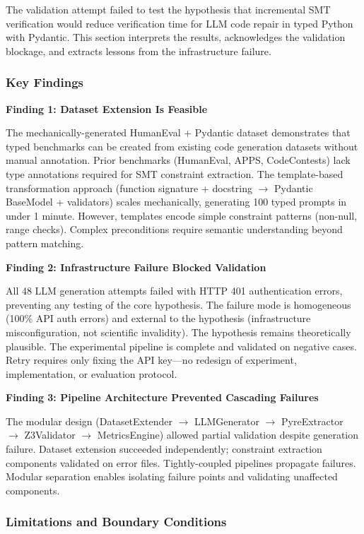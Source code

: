 
The validation attempt failed to test the hypothesis that incremental SMT verification would reduce verification time for LLM code repair in typed Python with Pydantic. This section interprets the results, acknowledges the validation blockage, and extracts lessons from the infrastructure failure.

\subsubsection{Key Findings}

\textbf{Finding 1: Dataset Extension Is Feasible}

The mechanically-generated HumanEval + Pydantic dataset demonstrates that typed benchmarks can be created from existing code generation datasets without manual annotation. Prior benchmarks (HumanEval, APPS, CodeContests) lack type annotations required for SMT constraint extraction. The template-based transformation approach (function signature + docstring $\rightarrow$ Pydantic BaseModel + validators) scales mechanically, generating 100 typed prompts in under 1 minute. However, templates encode simple constraint patterns (non-null, range checks). Complex preconditions require semantic understanding beyond pattern matching.

\textbf{Finding 2: Infrastructure Failure Blocked Validation}

All 48 LLM generation attempts failed with HTTP 401 authentication errors, preventing any testing of the core hypothesis. The failure mode is homogeneous (100\% API auth errors) and external to the hypothesis (infrastructure misconfiguration, not scientific invalidity). The hypothesis remains theoretically plausible. The experimental pipeline is complete and validated on negative cases. Retry requires only fixing the API key---no redesign of experiment, implementation, or evaluation protocol.

\textbf{Finding 3: Pipeline Architecture Prevented Cascading Failures}

The modular design (DatasetExtender $\rightarrow$ LLMGenerator $\rightarrow$ PyreExtractor $\rightarrow$ Z3Validator $\rightarrow$ MetricsEngine) allowed partial validation despite generation failure. Dataset extension succeeded independently; constraint extraction components validated on error files. Tightly-coupled pipelines propagate failures. Modular separation enables isolating failure points and validating unaffected components.

\subsubsection{Limitations and Boundary Conditions}

